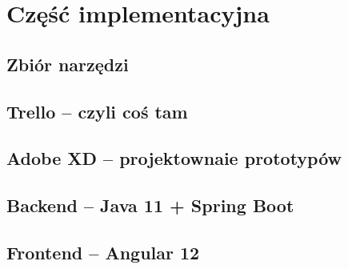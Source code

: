 \chapter{Część implementacyjna}

\section{Zbiór narzędzi}

\section{Trello -- czyli coś tam}

\section{Adobe XD -- projektownaie prototypów}

\section{Backend -- Java 11 + Spring Boot}

\section{Frontend -- Angular 12}